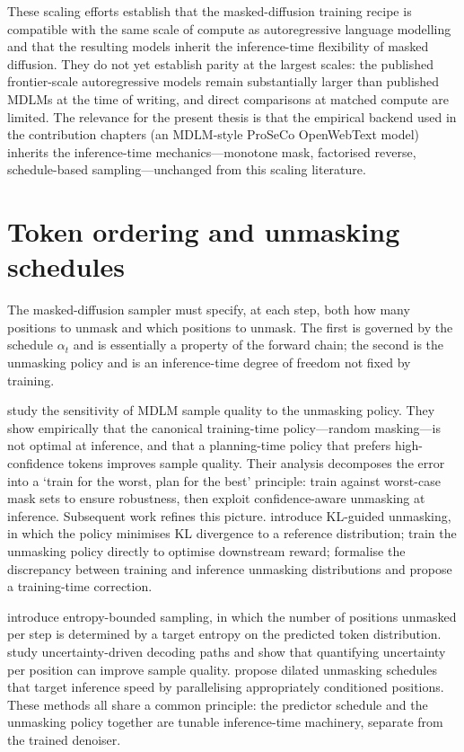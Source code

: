 These scaling efforts establish that the masked-diffusion training recipe
is compatible with the same scale of compute as autoregressive language
modelling and that the resulting models inherit the inference-time
flexibility of masked diffusion. They do not yet establish parity at the
largest scales: the published frontier-scale autoregressive models remain
substantially larger than published MDLMs at the time of writing, and
direct comparisons at matched compute are limited. The relevance for the
present thesis is that the empirical backend used in the contribution
chapters (an MDLM-style ProSeCo OpenWebText model) inherits the
inference-time mechanics---monotone mask, factorised reverse, schedule-based
sampling---unchanged from this scaling literature.

\section{Token ordering and unmasking schedules}
\label{lit:sec:token-ordering}

The masked-diffusion sampler must specify, at each step, both how many
positions to unmask and which positions to unmask. The first is governed by
the schedule $\alpha_t$ and is essentially a property of the forward chain;
the second is the unmasking policy and is an inference-time degree of
freedom not fixed by training.

\textcite{kim2025tokenordering} study the sensitivity of MDLM sample
quality to the unmasking policy. They show empirically that the canonical
training-time policy---random masking---is not optimal at inference, and
that a planning-time policy that prefers high-confidence tokens improves
sample quality. Their analysis decomposes the error into a `train for the
worst, plan for the best' principle: train against worst-case mask sets to
ensure robustness, then exploit confidence-aware unmasking at inference.
Subsequent work refines this picture. \textcite{kim2025klass} introduce
KL-guided unmasking, in which the policy minimises KL divergence to a
reference distribution; \textcite{hong2025upo} train the unmasking policy
directly to optimise downstream reward; \textcite{he2025mdpo} formalise the
discrepancy between training and inference unmasking distributions and
propose a training-time correction.

\textcite{benhamu2025ebsampler} introduce entropy-bounded sampling, in
which the number of positions unmasked per step is determined by a target
entropy on the predicted token distribution. \textcite{chen2025denoisingentropy}
study uncertainty-driven decoding paths and show that quantifying
uncertainty per position can improve sample quality.
\textcite{luxembourg2025plan} propose dilated unmasking schedules that
target inference speed by parallelising appropriately conditioned positions.
These methods all share a common principle: the predictor schedule and the
unmasking policy together are tunable inference-time machinery, separate
from the trained denoiser.

